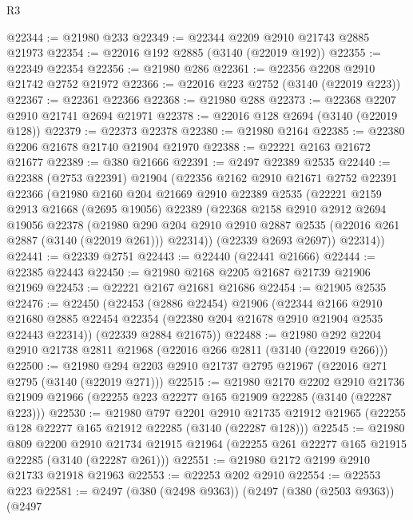 \begin{lexlean}{R3}
\begin{coremodule}
@22344 := @21980 @233
@22349 := @22344 @2209 @2910 @21743 @2885 @21973
@22354 := @22016 @192 @2885 (@3140 (@22019 @192))
@22355 := @22349 @22354
@22356 := @21980 @286
@22361 := @22356 @2208 @2910 @21742 @2752 @21972
@22366 := @22016 @223 @2752 (@3140 (@22019 @223))
@22367 := @22361 @22366
@22368 := @21980 @288
@22373 := @22368 @2207 @2910 @21741 @2694 @21971
@22378 := @22016 @128 @2694 (@3140 (@22019 @128))
@22379 := @22373 @22378
@22380 := @21980 @2164
@22385 := @22380 @2206 @21678 @21740 @21904 @21970
@22388 := @22221 @2163 @21672 @21677
@22389 := @380 @21666
@22391 := @2497 @22389 @2535
@22440 := @22388
    (@2753 @22391)
    @21904
    (@22356
      @2162
      @2910
      @21671
      @2752
      @22391
      @22366
      (@21980
        @2160
        @204
        @21669
        @2910
        @22389
        @2535
        (@22221
          @2159
          @2913
          @21668
          (@2695 @19056)
          @22389
          (@22368
            @2158
            @2910
            @2912
            @2694
            @19056
            @22378
            (@21980
              @290
              @204
              @2910
              @2910
              @2887
              @2535
              (@22016 @261 @2887 (@3140 (@22019 @261)))
              @22314))
          (@22339 @2693 @2697))
        @22314))
@22441 := @22339 @2751
@22443 := @22440 (@22441 @21666)
@22444 := @22385 @22443
@22450 := @21980 @2168 @2205 @21687 @21739 @21906 @21969
@22453 := @22221 @2167 @21681 @21686
@22454 := @21905 @2535
@22476 := @22450
    (@22453
      (@2886 @22454)
      @21906
      (@22344
        @2166
        @2910
        @21680
        @2885
        @22454
        @22354
        (@22380 @204 @21678 @2910 @21904 @2535 @22443 @22314))
      (@22339 @2884 @21675))
@22488 := @21980 @292 @2204 @2910 @21738 @2811 @21968 (@22016 @266 @2811 (@3140 (@22019 @266)))
@22500 := @21980 @294 @2203 @2910 @21737 @2795 @21967 (@22016 @271 @2795 (@3140 (@22019 @271)))
@22515 := @21980
    @2170
    @2202
    @2910
    @21736
    @21909
    @21966
    (@22255 @223 @22277 @165 @21909 @22285 (@3140 (@22287 @223)))
@22530 := @21980
    @797
    @2201
    @2910
    @21735
    @21912
    @21965
    (@22255 @128 @22277 @165 @21912 @22285 (@3140 (@22287 @128)))
@22545 := @21980
    @809
    @2200
    @2910
    @21734
    @21915
    @21964
    (@22255 @261 @22277 @165 @21915 @22285 (@3140 (@22287 @261)))
@22551 := @21980 @2172 @2199 @2910 @21733 @21918 @21963
@22553 := @22253 @202 @2910
@22554 := @22553 @223
@22581 := @2497
    (@380 (@2498 @9363))
    (@2497
      (@380 (@2503 @9363))
      (@2497

\end{coremodule}
\end{lexlean}
